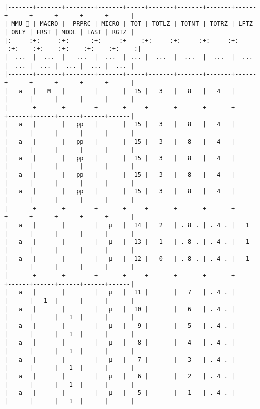 \documentclass[varwidth=\maxdimen,margin=0.5cm,multi={verbatim}]{standalone}
\begin{document}
\begin{verbatim}
|-------+-------+--------+-------+-----+-------+-------+-------+------+------+------+------+------+------|
| MMU_ | MACRO |  PRPRC | MICRO | TOT | TOTLZ | TOTNT | TOTRZ | LFTZ | ONLY | FRST | MDDL | LAST | RGTZ |
|:-----:+:-----:+:------:+:-----:+----:+:-----:+:-----:+:-----:+:----:+:----:+:----:+:----:+:----:+:----:|
|  ...  |  ...  |   ...  |  ...  | ... |  ...  |  ...  |  ...  |  ... |  ... |  ... |  ... |  ... |  ... |
|-------+-------+--------+-------+-----+-------+-------+-------+------+------+------+------+------+------|
|   a   |   M   |        |       |  15 |   3   |   8   |   4   |      |      |      |      |      |      |
|-------+-------+--------+-------+-----+-------+-------+-------+------+------+------+------+------+------|
|   a   |       |   pp   |       |  15 |   3   |   8   |   4   |      |      |      |      |      |      |
|   a   |       |   pp   |       |  15 |   3   |   8   |   4   |      |      |      |      |      |      |
|   a   |       |   pp   |       |  15 |   3   |   8   |   4   |      |      |      |      |      |      |
|   a   |       |   pp   |       |  15 |   3   |   8   |   4   |      |      |      |      |      |      |
|   a   |       |   pp   |       |  15 |   3   |   8   |   4   |      |      |      |      |      |      |
|-------+-------+--------+-------+-----+-------+-------+-------+------+------+------+------+------+------|
|   a   |       |        |   µ   |  14 |   2   | . 8 . | . 4 . |   1  |      |      |      |      |      |
|   a   |       |        |   µ   |  13 |   1   | . 8 . | . 4 . |   1  |      |      |      |      |      |
|   a   |       |        |   µ   |  12 |   0   | . 8 . | . 4 . |   1  |      |      |      |      |      |
|-------+-------+--------+-------+-----+-------+-------+-------+------+------+------+------+------+------|
|   a   |       |        |   µ   |  11 |       |   7   | . 4 . |      |      |   1  |      |      |      |
|   a   |       |        |   µ   |  10 |       |   6   | . 4 . |      |      |      |   1  |      |      |
|   a   |       |        |   µ   |   9 |       |   5   | . 4 . |      |      |      |   1  |      |      |
|   a   |       |        |   µ   |   8 |       |   4   | . 4 . |      |      |      |   1  |      |      |
|   a   |       |        |   µ   |   7 |       |   3   | . 4 . |      |      |      |   1  |      |      |
|   a   |       |        |   µ   |   6 |       |   2   | . 4 . |      |      |      |   1  |      |      |
|   a   |       |        |   µ   |   5 |       |   1   | . 4 . |      |      |      |   1  |      |      |

\end{verbatim}
\end{document}
